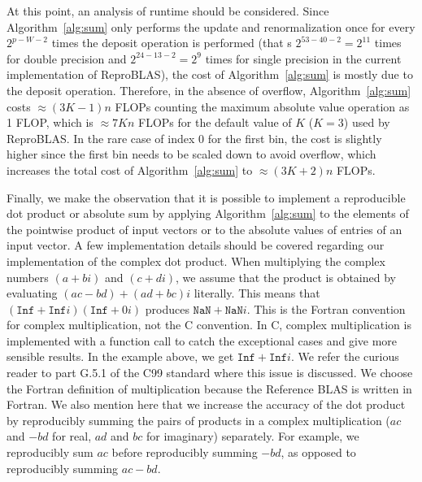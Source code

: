    At this point, an analysis of runtime should be considered. Since Algorithm~\ref{alg:sum} only performs the update and renormalization
  once for every $2^{p-W-2}$ times the deposit operation is performed (that
s $2^{53-40-2}=2^{11}$ times for double precision and $2^{24-13-2} = 2^9$ times for single precision in the current implementation of
  ReproBLAS), the cost of Algorithm~\ref{alg:sum} is mostly due to the
  deposit operation.
  Therefore, in the absence of overflow, Algorithm~\ref{alg:sum} costs
  $\approx (3K-1)n$ FLOPs counting the maximum absolute value operation as 1 FLOP,
  which is $\approx 7Kn$ FLOPs for the default value of $K$ ($K=3$) used by ReproBLAS.
  In the rare case of index 0 for the first bin,
  the cost is slightly higher since the first bin
  needs to be scaled down to avoid overflow, which increases the
  total cost of Algorithm~\ref{alg:sum} to $\approx (3K+2)n$ FLOPs.

  Finally, we make the observation that it is possible to implement a reproducible dot product or absolute sum by applying Algorithm~\ref{alg:sum} to the elements of the pointwise product of input vectors or to the absolute values of entries of an input vector.
  A few implementation details should be covered regarding our implementation of the complex dot product. When multiplying the complex numbers $(a + bi)$ and $(c + di)$, we assume that the product is obtained by evaluating $(ac - bd) + (ad + bc)i$ literally. This means that $(\texttt{Inf} + \texttt{Inf}i)(\texttt{Inf} + 0i)$ produces $\texttt{NaN} + \texttt{NaN}i$.
  This is the Fortran convention for complex multiplication, not the C convention. In C, complex multiplication is implemented with a function call to catch the exceptional cases and give more sensible results. In the example above, we get $\texttt{Inf} + \texttt{Inf}i$. We refer the curious reader to part G.5.1 of the C99 standard \cite{c99} where this issue is discussed. We choose the Fortran definition of multiplication because the Reference BLAS is written in Fortran. We also mention here that we increase the accuracy of the dot product by reproducibly summing the pairs of products in a complex multiplication ($ac$ and $-bd$ for real, $ad$ and $bc$ for imaginary) separately. For example, we reproducibly sum $ac$ before reproducibly summing $-bd$, as opposed to reproducibly summing $ac - bd$.





